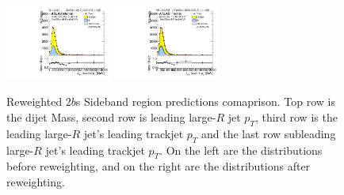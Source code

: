 \begin{figure}[htbp!]
\begin{center}
\includegraphics[width=0.31\textwidth,angle=-90]{figures/boosted/Prereweight/Moriond_TwoTag_split_Sideband_sublHCand_trk0_Pt.pdf}
\includegraphics[width=0.31\textwidth,angle=-90]{figures/boosted/Sideband/b77_TwoTag_split_Sideband_sublHCand_trk0_Pt.pdf}\\
\caption{Reweighted 2$b$s Sideband region predictions comaprison. Top row is the dijet Mass, second row is leading large-$R$ jet $p_{T}$, third row is the leading large-$R$ jet's leading trackjet $p_T$ and the last row subleading large-$R$ jet's leading trackjet $p_T$. On the left are the distributions before reweighting, and on the right are the distributions after reweighting.}
\label{fig:rw-2bs-comp-sb}
\end{center}
\end{figure}


